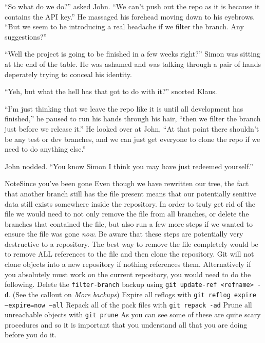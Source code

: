 {\begin{trenches}
``So what do we do?'' asked John.
``We can't push out the repo as it is because it contains the API key.''
He massaged his forehead moving down to his eyebrows.
``But we seem to be introducing a real headache if we filter the branch. Any suggestions?''

``Well the project is going to be finished in a few weeks right?'' Simon was sitting at the end of the table.
He was ashamed and was talking through a pair of hands deperately trying to conceal his identity.

``Yeh, but what the hell has that got to do with it?'' snorted Klaus.

``I'm just thinking that we leave the repo like it is until all development has finished,'' he paused to run his hands through his hair,
``then we filter the branch just before we release it.''
He looked over at John, ``At that point there shouldn't be any test or dev branches, and we can just get everyone to clone the repo if we need to do anything else.''

John nodded.  ``You know Simon I think you may have just redeemed yourself.''
\end{trenches}

\begin{callout}{Note}{Since you've been gone}
Even though we have rewritten our tree, the fact that another branch still has the file present means that our potentially senitive data still exists somewhere inside the repository.
In order to truly get rid of the file we would need to not only remove the file from all branches, or delete the branches that contained the file,
but also run a few more steps if we wanted to ensure the file was gone \emph{now}.
Be aware that these steps are potentially very destructive to a repository.
The best way to remove the file completely would be to remove ALL references to the file and then clone the repository.
Git will not clone objects into a new repository if nothing references them.
Alternatively if you absolutely must work on the current repository, you would need to do the following.
\newline
\newline
Delete the \texttt{filter-branch} backup using \texttt{git update-ref <refname> -d}.  (See the callout on \emph{More backups})
\newline
\newline
Expire all reflogs with \texttt{git reflog expire --expire=now --all}
\newline
\newline
Repack all of the pack files with \texttt{git repack -ad}
\newline
\newline
Prune all unreachable objects with \texttt{git prune}
\newline
\newline
As you can see some of these are quite scary procedures and so it is important that you understand all that you are doing before you do it.
\end{callout}

}
